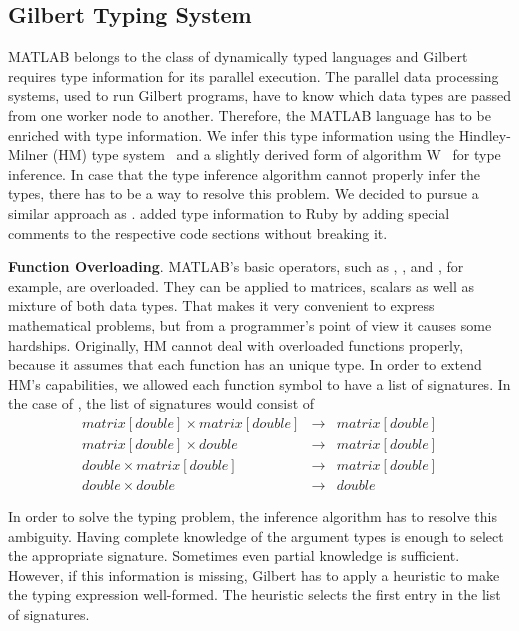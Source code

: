 \subsection{Gilbert Typing System}
\label{sec:gilberttyping}

MATLAB belongs to the class of dynamically typed languages and Gilbert requires type information for its parallel execution.
The parallel data processing systems, used to run Gilbert programs, have to know which data types are passed from one worker node to another.
Therefore, the MATLAB language has to be enriched with type information. We infer this type information using the Hindley-Milner (HM) type system~\cite{hindley:tams1969a,milner:jcss1978a} and a slightly derived form of algorithm W~\cite{damas:1982a} for type inference. In case that the type inference algorithm cannot properly infer the types, there has to be a way to resolve this problem. We decided to pursue a similar approach as \cite{furr:2009a}. \cite{furr:2009a} added type information to Ruby by adding special comments to the respective code sections without breaking it.


\textbf{Function Overloading}. MATLAB's basic operators, such as \code{+}, \code{-}, \code{/} and \code{*}, for example, are overloaded.
They can be applied to matrices, scalars as well as mixture of both data types.
That makes it very convenient to express mathematical problems, but from a programmer's point of view it causes some hardships.
Originally, HM cannot deal with overloaded functions properly, because it assumes that each function has an unique type.
In order to extend HM's capabilities, we allowed each function symbol to have a list of signatures.
In the case of \code{+}, the list of signatures would consist of 
\begin{eqnarray*}
matrix[double] \times matrix[double] &\rightarrow& matrix[double]\\
matrix[double] \times double &\rightarrow& matrix[double]\\
double \times matrix[double] &\rightarrow& matrix[double]\\
double \times double &\rightarrow& double
\end{eqnarray*}

In order to solve the typing problem, the inference algorithm has to resolve this ambiguity.
Having complete knowledge of the argument types is enough to select the appropriate signature.
Sometimes even partial knowledge is sufficient.
However, if this information is missing, Gilbert has to apply a heuristic to make the typing expression well-formed.
The heuristic selects the first entry in the list of signatures.

